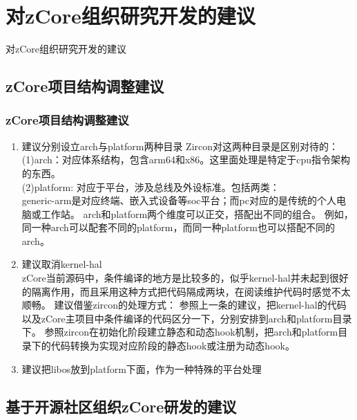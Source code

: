 \documentclass[
8pt, %
]{beamer}
\begin{document}
	\section{对zCore组织研究开发的建议}
	
	\begin{frame}
		\begin{center}
			{\LARGE 对zCore组织研究开发的建议\\}
		\end{center}
	\end{frame}

	\subsection{zCore项目结构调整建议}
	
	\begin{frame}
		\frametitle{zCore项目结构调整建议}
		\begin{enumerate}
			\item 建议分别设立arch与platform两种目录
			Zircon对这两种目录是区别对待的：\\
			(1)arch：对应体系结构，包含arm64和x86。这里面处理是特定于cpu指令架构的东西。\\
			(2)platform: 对应于平台，涉及总线及外设标准。包括两类：\\
			generic-arm是对应终端、嵌入式设备等soc平台；而pc对应的是传统的个人电脑或工作站。
			arch和platform两个维度可以正交，搭配出不同的组合。
			例如，同一种arch可以配套不同的platform，而同一种platform也可以搭配不同的arch。
			\item 建议取消kernel-hal\\
			zCore当前源码中，条件编译的地方是比较多的，似乎kernel-hal并未起到很好的隔离作用，而且采用这种方式把代码隔成两块，在阅读维护代码时感觉不太顺畅。
			建议借鉴zircon的处理方式：
			参照上一条的建议，把kernel-hal的代码以及zCore主项目中条件编译的代码区分一下，分别安排到arch和platform目录下。
			参照zircon在初始化阶段建立静态和动态hook机制，把arch和platform目录下的代码转换为实现对应阶段的静态hook或注册为动态hook。
			\item 建议把libos放到platform下面，作为一种特殊的平台处理
		\end{enumerate}
	\end{frame}

	\subsection{基于开源社区组织zCore研发的建议}
	
\end{document}
